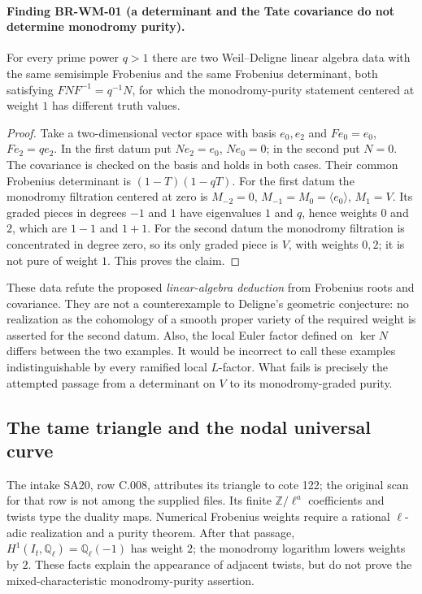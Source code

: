 \paragraph{Finding BR-WM-01 (a determinant and the Tate covariance do not
determine monodromy purity).}
For every prime power $q>1$ there are two Weil--Deligne linear
algebra data with the same semisimple Frobenius and the same
Frobenius determinant, both satisfying $FNF^{-1}=q^{-1}N$, for
which the monodromy-purity statement centered at weight $1$ has
different truth values.

\begin{proof}
Take a two-dimensional vector space with basis $e_0,e_2$ and
$Fe_0=e_0$, $Fe_2=qe_2$.  In the first datum put
$Ne_2=e_0$, $Ne_0=0$; in the second put $N=0$.
The covariance is checked on the basis and holds in both cases.
Their common Frobenius determinant is $(1-T)(1-qT)$.
For the first datum the monodromy filtration centered at zero is
$M_{-2}=0$, $M_{-1}=M_0=\langle e_0\rangle$, $M_1=V$.
Its graded pieces in degrees $-1$ and $1$ have eigenvalues $1$
and $q$, hence weights $0$ and $2$, which are $1-1$ and $1+1$.
For the second datum the monodromy filtration is concentrated in
degree zero, so its only graded piece is $V$, with weights $0,2$;
it is not pure of weight $1$.  This proves the claim.
\end{proof}

These data refute the proposed \emph{linear-algebra deduction} from
Frobenius roots and covariance.  They are not a counterexample to
Deligne's geometric conjecture: no realization as the cohomology
of a smooth proper variety of the required weight is asserted for
the second datum.  Also, the local Euler factor defined on
$\ker N$ differs between the two examples.  It would be incorrect
to call these examples indistinguishable by every ramified local
$L$-factor.  What fails is precisely the attempted passage from
a determinant on $V$ to its monodromy-graded purity.

\subsection{The tame triangle and the nodal universal curve}

The intake SA20, row C.008, attributes its triangle to cote 122;
the original scan for that row is not among the supplied files.
Its finite $\mathbb Z/\ell^a$ coefficients and twists type the
duality maps.  Numerical Frobenius weights require a rational
$\ell$-adic realization and a purity theorem.  After that passage,
$H^1(I_t,\mathbb Q_\ell)=\mathbb Q_\ell(-1)$ has weight $2$;
the monodromy logarithm lowers weights by $2$.  These facts explain
the appearance of adjacent twists, but do not prove the
mixed-characteristic monodromy-purity assertion.

